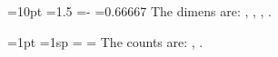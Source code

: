 =10pt
=1.5
=-
=0.66667
The dimens are: \the{}, \the{}, \the{}, \the{}.\par
{}=1pt
=1sp
=
=
The counts are: \the{}, \the{}.\par
\bye
